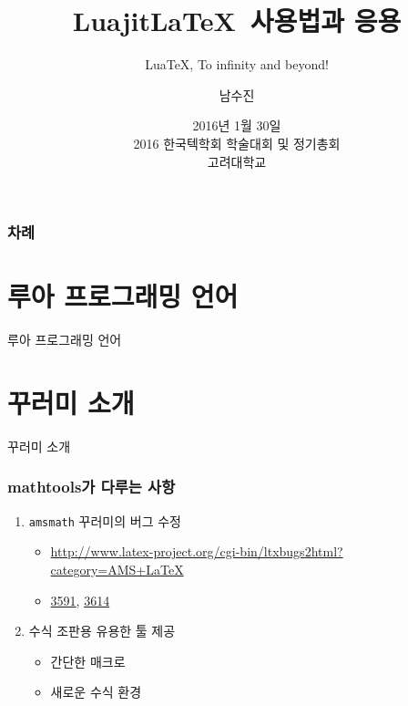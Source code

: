 \documentclass{beamer}
\title{Luajit\LaTeX\ 사용법과 응용}
\subtitle{Lua\TeX, To infinity and beyond!}
\author{남수진}
\date{ 2016년 1월 30일\\
2016 한국텍학회 학술대회 및 정기총회 \\
{\small 고려대학교}}
\begin{document}
\begin{frame}
\titlepage
\end{frame}

\begin{frame}[t]
\frametitle{차례}
\tableofcontents
\end{frame}

\section{루아 프로그래밍 언어}

\begin{frame}
\huge
\centering 루아 프로그래밍 언어
\end{frame}

\section{꾸러미 소개}

\begin{frame}
\huge
\centering 꾸러미 소개
\end{frame}

\begin{frame}[t]
\frametitle{mathtools가 다루는 사항}
\begin{enumerate}
\item \texttt{amsmath} 꾸러미의 버그 수정  
\begin{itemize}
\item \url{http://www.latex-project.org/cgi-bin/ltxbugs2html?
category=AMS+LaTeX}
\item \href{http://www.latex-project.org/cgi-bin/ltxbugs2html?
pr=amslatex/3591&category=AMS+LaTeX}{3591}, \href{http://
www.latex-project.org/cgi-bin/ltxbugs2html?pr=amslatex/
3614&category=AMS+LaTeX}{3614}
\end{itemize}
\item 수식 조판용 유용한 툴 제공 
\begin{itemize}
\item 간단한 매크로 
\item 새로운 수식 환경
\end{itemize}
\end{enumerate}
\end{frame}

\end{document}
